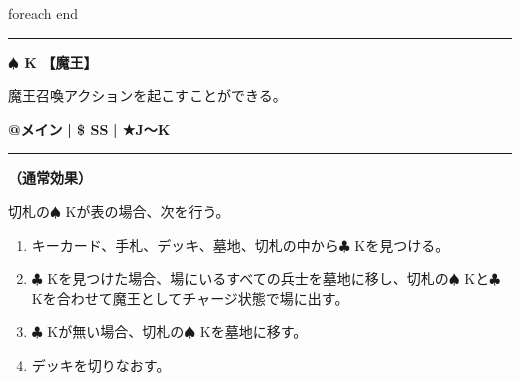 \documentclass[twocolumn,a5paper,papersize,10pt]{jarticle}
\begin{document}
\vspace{-1zh}
 foreach end
 

\vspace{3mm} %
\hrule height 0.5mm depth 0mm width 66.5mm %
\vspace{1mm} %
{\Large\bf $\spadesuit$ K} {\normalsize\bf【魔王】} %
\vspace{1mm} %

魔王召喚アクションを起こすことができる。

\begin{tcolorbox}[title={\small\bf【Action】魔王召喚}{\scriptsize （召喚）}]

{\scriptsize\bf @メイン }
  {\scriptsize\bf | \$ SS }
  {\scriptsize\bf | ★J〜K}

\vspace{1mm} %
\hrule height 0.1mm depth 0mm width 62mm %
\vspace{1mm} %

{\bf（通常効果）}

切札の{\normalsize $\spadesuit$} Kが表の場合、次を行う。


\vspace{-1zh}%
\begin{enumerate}
\setlength{\leftskip}{-0.3cm}
\setlength{\parskip}{0pt} %

\item キーカード、手札、デッキ、墓地、切札の中から{\normalsize $\clubsuit$} Kを見つける。

\item {\normalsize $\clubsuit$} Kを見つけた場合、場にいるすべての兵士を墓地に移し、切札の{\normalsize $\spadesuit$} Kと{\normalsize $\clubsuit$} Kを合わせて魔王としてチャージ状態で場に出す。

\item {\normalsize $\clubsuit$} Kが無い場合、切札の{\normalsize $\spadesuit$} Kを墓地に移す。

\item デッキを切りなおす。
\vspace{-1zh}%
\end{enumerate}

\vspace{1mm} %
\end{tcolorbox}

\vspace{-1zh}
  
\end{document}
